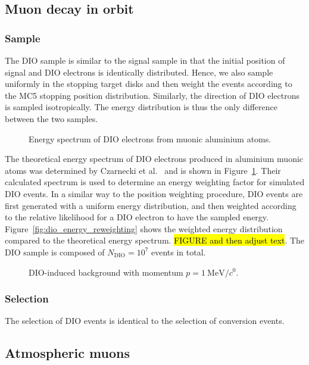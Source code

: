 \subsection{Muon decay in orbit}
\subsubsection{Sample}
The DIO sample is similar to the signal sample in that the initial position
of signal and DIO electrons is identically distributed. Hence, we also sample
uniformly in the stopping target disks and then weight the events according to
the MC5 stopping position distribution. Similarly, the direction of DIO
electrons is sampled isotropically. The energy distribution is thus the only
difference between the two samples. 

\begin{figure}
    \centering
    
    \caption{Energy spectrum of DIO electrons from muonic aluminium atoms.}
    \label{fig:czarnecki_spectrum}
\end{figure}

The theoretical energy spectrum of DIO electrons produced in aluminium muonic
atoms was determined by Czarnecki et al.~\cite{czarnecki} and is shown in
Figure~\ref{fig:czarnecki_spectrum}. Their calculated spectrum is used to
determine an energy weighting factor for simulated DIO events. In a similar way
to the position weighting procedure, DIO events are first generated with a
uniform energy distribution, and then weighted according to the relative
likelihood for a DIO electron to have the sampled energy.
Figure~\ref{fig:dio_energy_reweighting} shows the weighted energy distribution
compared to the theoretical energy spectrum. \hl{FIGURE and then adjust text}.
The DIO sample is composed of $N_\mathrm{DIO} = 10^7$ events in total.

\begin{figure}
    \centering
    
    \caption{DIO-induced background with momentum  $p=\SI{1}{\MeV/\clight}$.}
    \label{fig:muon_dio_in_cydet}
\end{figure}

\subsubsection{Selection}
The selection of DIO events is identical to the selection of conversion events.

\subsection{Atmospheric muons}

